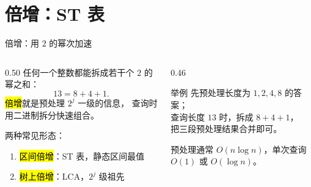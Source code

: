\documentclass[aspectratio=169]{beamer}
\begin{document}
\section{倍增：ST 表}

\begin{frame}{倍增：用 $2$ 的幂次加速}
    \begin{columns}[T]
        \begin{column}{0.50\textwidth}
            \small
            任何一个整数都能拆成若干个 $2$ 的幂之和：
            \[
                13=8+4+1.
            \]
            \hl{倍增}就是预处理 $2^j$ 一级的信息，
            查询时用二进制拆分快速组合。

            \vspace{0.5em}
            两种常见形态：
            \begin{enumerate}
                \item \hl{区间倍增}：ST 表，静态区间最值
                \item \hl{树上倍增}：LCA，$2^j$ 级祖先
            \end{enumerate}
        \end{column}
        \begin{column}{0.46\textwidth}
            \begin{exampleblock}{举例}
                \footnotesize
                先预处理长度为 $1,2,4,8$ 的答案；\\
                查询长度 $13$ 时，拆成 $8+4+1$，\\
                把三段预处理结果合并即可。
            \end{exampleblock}
            \vspace{0.4em}
            \footnotesize
            预处理通常 $O(n\log n)$，单次查询 $O(1)$ 或 $O(\log n)$。
        \end{column}
    \end{columns}
\end{frame}
\end{document}
